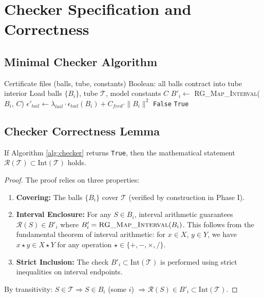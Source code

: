 \section{Checker Specification and Correctness}
\label{sec:checker_spec}

\subsection{Minimal Checker Algorithm}
\begin{algorithm}[H]
\caption{Minimal Verifier (Pseudocode)}
\label{alg:checker}
\begin{algorithmic}[1]
\REQUIRE Certificate files (balls, tube, constants)
\ENSURE Boolean: all balls contract into tube interior
\STATE Load balls $\{B_i\}$, tube $\mathcal{T}$, model constants $C$
    \STATE $B'_i \leftarrow$ \textsc{RG\_Map\_Interval}($B_i$, $C$) 
    \STATE $\epsilon'_{tail} \leftarrow \lambda_{tail} \cdot \epsilon_{tail}(B_i) + C_{feed} \cdot \|B_i\|^2$ 
        \RETURN \texttt{False}
    \ENDIF
\ENDFOR
\RETURN \texttt{True}
\end{algorithmic}
\end{algorithm}

\subsection{Checker Correctness Lemma}
\begin{lemma}
\label{lem:checker_sound}
If Algorithm \ref{alg:checker} returns \texttt{True}, then the mathematical statement $\mathcal{R}(\mathcal{T}) \subset \mathrm{Int}(\mathcal{T})$ holds.
\end{lemma}
\begin{proof}
The proof relies on three properties:
\begin{enumerate}
    \item \textbf{Covering:} The balls $\{B_i\}$ cover $\mathcal{T}$ (verified by construction in Phase I).
    \item \textbf{Interval Enclosure:} For any $S \in B_i$, interval arithmetic guarantees $\mathcal{R}(S) \in B'_i$ where $B'_i = \textsc{RG\_Map\_Interval}(B_i)$. This follows from the fundamental theorem of interval arithmetic: for $x \in X$, $y \in Y$, we have $x \star y \in X \star Y$ for any operation $\star \in \{+,-,\times,/\}$.
    \item \textbf{Strict Inclusion:} The check $B'_i \subset \mathrm{Int}(\mathcal{T})$ is performed using strict inequalities on interval endpoints.
\end{enumerate}
By transitivity: $S \in \mathcal{T} \Rightarrow S \in B_i$ (some $i$) $\Rightarrow \mathcal{R}(S) \in B'_i \subset \mathrm{Int}(\mathcal{T})$.
\end{proof}


